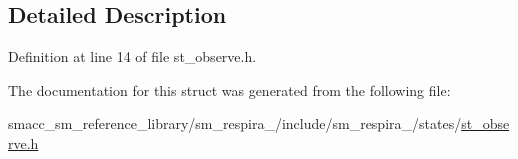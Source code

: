 \subsection{Detailed Description}


Definition at line 14 of file st\+\_\+observe.\+h.



The documentation for this struct was generated from the following file\+:\begin{DoxyCompactItemize}
\item 
smacc\+\_\+sm\+\_\+reference\+\_\+library/sm\+\_\+respira\+\_/include/sm\+\_\+respira\+\_/states/\hyperlink{sm__respira__1_2include_2sm__respira__1_2states_2st__observe_8h}{st\+\_\+observe.\+h}\end{DoxyCompactItemize}
